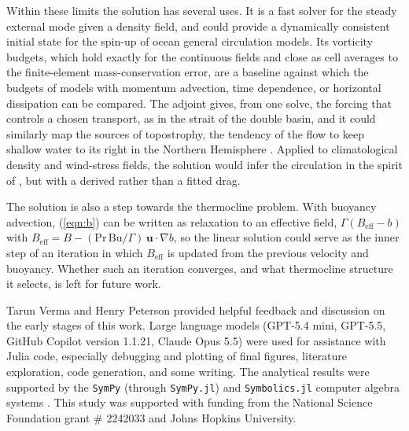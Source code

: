 \documentclass{ametsocV6.2}
\begin{document}
Within these limits the solution has several uses.
It is a fast solver for the steady external mode given a density field, and could provide a dynamically consistent initial state for the spin-up of ocean general circulation models.
Its vorticity budgets, which hold exactly for the continuous fields and close as cell averages to the finite-element mass-conservation error, are a baseline against which the budgets of models with momentum advection, time dependence, or horizontal dissipation can be compared.
The adjoint gives, from one solve, the forcing that controls a chosen transport, as in the strait of the double basin, and it could similarly map the sources of topostrophy, the tendency of the flow to keep shallow water to its right in the Northern Hemisphere \citep{merryfield&scott07,holloway08}.
Applied to climatological density and wind-stress fields, the solution would infer the circulation in the spirit of \citet{nost&isachsen03}, but with a derived rather than a fitted drag.


The solution is also a step towards the thermocline problem.
With buoyancy advection, (\ref{eqn:b}) can be written as relaxation to an effective field, $\Gamma (B_{\mathrm{eff}} - b)$ with $B_{\mathrm{eff}} = B - (\mathrm{Pr}\,\mathrm{Bu}/\Gamma)\, \mathbf{u} \cdot \nabla b$, so the linear solution could serve as the inner step of an iteration in which $B_{\mathrm{eff}}$ is updated from the previous velocity and buoyancy.
Whether such an iteration converges, and what thermocline structure it selects, is left for future work.


\acknowledgments

Tarun Verma and Henry Peterson provided helpful feedback and discussion on the early stages of this work.
Large language models (GPT-5.4 mini, GPT-5.5, GitHub Copilot version 1.1.21, Claude Opus 5.5) were used for assistance with Julia code, especially debugging and plotting of final figures, literature exploration, code generation, and some writing.
The analytical results were supported by the \texttt{SymPy} (through \texttt{SymPy.jl}) and \texttt{Symbolics.jl} computer algebra systems \citep{meurer_etal17,gowda_etal21}.
This study was supported with funding from the National Science Foundation grant \# 2242033 and Johns Hopkins University.

\end{document}
